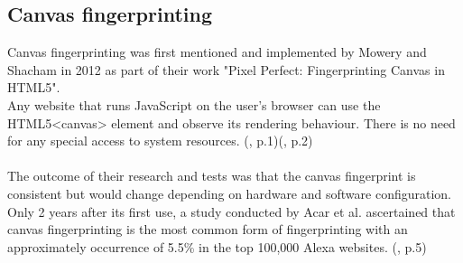 \subsection{Canvas fingerprinting} \label{canvasfp}
Canvas fingerprinting was first mentioned and implemented by Mowery and Shacham in 2012 as part of their work "Pixel Perfect: Fingerprinting Canvas in HTML5".\\ Any website that runs JavaScript on the user's browser can use the HTML5<canvas> element and observe its rendering behaviour. There is no need for any special access to system resources. (\textcite{mowery12}, p.1)(\textcite{upi15}, p.2)\\\\
The outcome of their research and tests was that the canvas fingerprint is consistent but would change depending on hardware and software configuration. Only 2 years after its first use, a study conducted by Acar et al. ascertained that canvas fingerprinting is the most common form of fingerprinting with an approximately occurrence of 5.5\% in the top 100,000 Alexa websites. (\textcite{acar14}, p.5)

